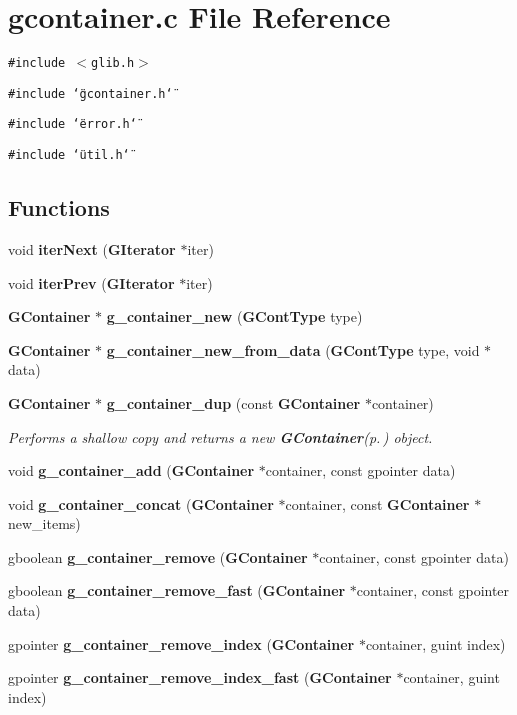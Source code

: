 \section{gcontainer.c File Reference}
\label{gcontainer_8c}
{\tt \#include $<$glib.h$>$}\par
{\tt \#include \char`\"{}gcontainer.h\char`\"{}}\par
{\tt \#include \char`\"{}error.h\char`\"{}}\par
{\tt \#include \char`\"{}util.h\char`\"{}}\par
\subsection*{Functions}
\begin{CompactItemize}
\item 
void {\bf iter\-Next} ({\bf GIterator} $\ast$iter)
\item 
void {\bf iter\-Prev} ({\bf GIterator} $\ast$iter)
\item 
{\bf GContainer} $\ast$ {\bf g\_\-container\_\-new} ({\bf GCont\-Type} type)
\item 
{\bf GContainer} $\ast$ {\bf g\_\-container\_\-new\_\-from\_\-data} ({\bf GCont\-Type} type, void $\ast$data)
\item 
{\bf GContainer} $\ast$ {\bf g\_\-container\_\-dup} (const {\bf GContainer} $\ast$container)
\begin{CompactList}\small\item\em Performs a shallow copy and returns a new {\bf GContainer}{\rm (p.\,\pageref{structGContainer})} object. \item\end{CompactList}\item 
void {\bf g\_\-container\_\-add} ({\bf GContainer} $\ast$container, const gpointer data)
\item 
void {\bf g\_\-container\_\-concat} ({\bf GContainer} $\ast$container, const {\bf GContainer} $\ast$new\_\-items)
\item 
gboolean {\bf g\_\-container\_\-remove} ({\bf GContainer} $\ast$container, const gpointer data)
\item 
gboolean {\bf g\_\-container\_\-remove\_\-fast} ({\bf GContainer} $\ast$container, const gpointer data)
\item 
gpointer {\bf g\_\-container\_\-remove\_\-index} ({\bf GContainer} $\ast$container, guint index)
\item 
gpointer {\bf g\_\-container\_\-remove\_\-index\_\-fast} ({\bf GContainer} $\ast$container, guint index)

\end{CompactItemize}
